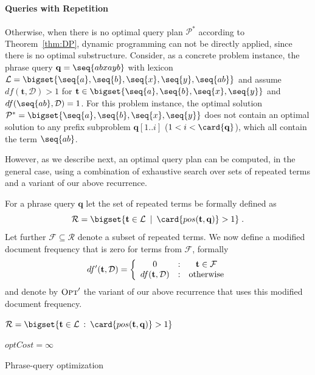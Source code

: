 \paragraph{Queries with Repetition}
Otherwise, when there is no optimal query plan $\mathcal{P}^*$
according to Theorem~\ref{thm:DP}, dynamic programming can not be
directly applied, since there is no optimal substructure. Consider, as
a concrete problem instance, the phrase query
$\mathbf{q} = \seq{abxayb}$ with lexicon
$\mathcal{L} = \bigset{\seq{a}, \seq{b}, \seq{x}, \seq{y}, \seq{ab}}$
and assume $df(\mathbf{t}, \mathcal{D}) > 1$ for
$\mathbf{t} \in \bigset{\seq{a}, \seq{b}, \seq{x}, \seq{y}}$ and
$df(\seq{ab}, \mathcal{D}) = 1$. For this problem instance, the
optimal solution
$\mathcal{P}^* = \bigset{\seq{a}, \seq{b}, \seq{x}, \seq{y}}$ does not
contain an optimal solution to any prefix subproblem
$\mathbf{q}[1..i]$ ($1 < i < \card{\mathbf{q}}$), which all contain
the term $\seq{ab}$.

However, as we describe next, an optimal query plan can be computed,
in the general case, using a combination of exhaustive search over
sets of repeated terms and a variant of our above recurrence.

For a phrase query $\mathbf{q}$ let the set of repeated terms be
formally defined as
$$
\mathcal{R} = \bigset{\mathbf{t} \in \mathcal{L} \:\mid\: \card{pos(\mathbf{t}, \mathbf{q})} > 1}\;.
$$
Let further $\mathcal{F} \subseteq \mathcal{R}$ denote a subset of
repeated terms. We now define a modified document frequency that is
zero for terms from $\mathcal{F}$, formally
$$
df'(\mathbf{t}, \mathcal{D}) = \left\{
\begin{array}{c@{\quad:\quad}c}
0 & \mathbf{t} \in \mathcal{F}\\
df(\mathbf{t}, \mathcal{D}) & \mbox{otherwise}
\end{array}
\right.
$$
and denote by $\textsc{Opt}'$ the variant of our above recurrence that
uses this modified document frequency.

\begin{algorithm}[t]


  \showln$\mathcal{R} = \bigset{ \mathbf{t} \in \mathcal{L} \::\: \card{pos(\mathbf{t}, \mathbf{q})} > 1}$

  \showln $optCost = \infty$

  \showln{}

  \showln{}

  \BlankLine

  \caption{Phrase-query optimization}
    
  \label{alg:EEA}
\end{algorithm}

